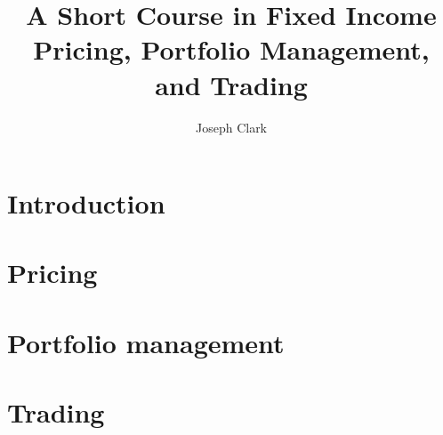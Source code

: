 \documentclass[a4paper,fleqn]{book}
\begin{document}
\frontmatter

\title{A Short Course in Fixed Income Pricing, Portfolio Management, and Trading}
\author{Joseph Clark}

\maketitle
\date{}

%

\setlength{\parskip}{0ex plus 0.5ex minus 0.2ex}
\tableofcontents

\setlength{\parskip}{1.3ex plus 0.2ex minus 0.2ex}

\mainmatter
\fancyhead[LO]{\leftmark}

\chapter{Introduction}

\chapter{Pricing}

\chapter{Portfolio management }

\chapter{Trading}


\newpage
\pagestyle{plain}


\newpage
\end{document}
